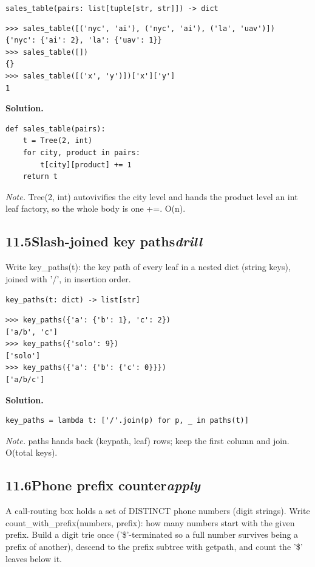 \documentclass[10pt,letterpaper]{book}
\begin{document}
\noindent\texttt{sales\_table(pairs: list[tuple[str, str]]) -> dict}
\begin{lstlisting}[style=ex]
>>> sales_table([('nyc', 'ai'), ('nyc', 'ai'), ('la', 'uav')])
{'nyc': {'ai': 2}, 'la': {'uav': 1}}
>>> sales_table([])
{}
>>> sales_table([('x', 'y')])['x']['y']
1
\end{lstlisting}
\noindent\textbf{Solution.}
\begin{lstlisting}[style=code]
def sales_table(pairs):
    t = Tree(2, int)
    for city, product in pairs:
        t[city][product] += 1
    return t
\end{lstlisting}
\noindent\textit{Note.} Tree(2, int) autovivifies the city level and hands the product level an int leaf factory, so the whole body is one +=. O(n).

\subsection*{11.5\quad Slash-joined key paths\hfill\textnormal{\textit{drill}}}
Write key\_paths(t): the key path of every leaf in a nested dict (string keys), joined with '/', in insertion order.

\noindent\texttt{key\_paths(t: dict) -> list[str]}
\begin{lstlisting}[style=ex]
>>> key_paths({'a': {'b': 1}, 'c': 2})
['a/b', 'c']
>>> key_paths({'solo': 9})
['solo']
>>> key_paths({'a': {'b': {'c': 0}}})
['a/b/c']
\end{lstlisting}
\noindent\textbf{Solution.}
\begin{lstlisting}[style=code]
key_paths = lambda t: ['/'.join(p) for p, _ in paths(t)]
\end{lstlisting}
\noindent\textit{Note.} paths hands back (keypath, leaf) rows; keep the first column and join. O(total keys).

\subsection*{11.6\quad Phone prefix counter\hfill\textnormal{\textit{apply}}}
A call-routing box holds a set of DISTINCT phone numbers (digit strings). Write count\_with\_prefix(numbers, prefix): how many numbers start with the given prefix. Build a digit trie once ('\$'-terminated so a full number survives being a prefix of another), descend to the prefix subtree with getpath, and count the '\$' leaves below it.
\end{document}
